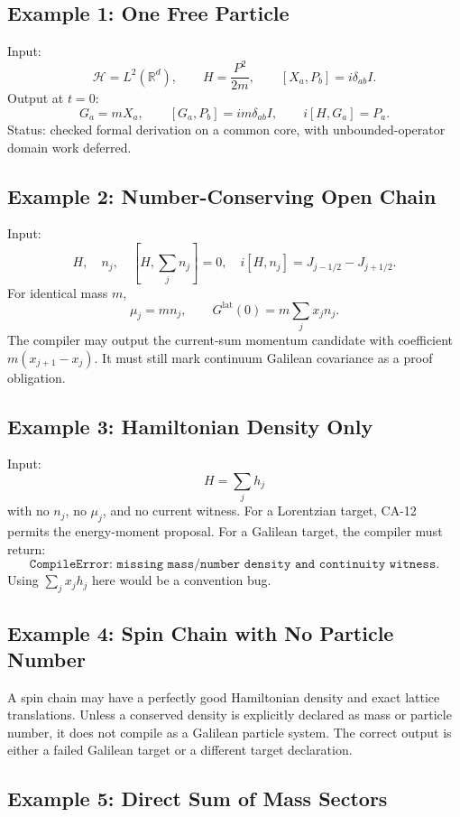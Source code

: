 \subsection{Example 1: One Free Particle}

Input:
\[
  \mathcal H=L^2(\mathbb R^d),\qquad
  H=\frac{P^2}{2m},\qquad
  [X_a,P_b]=i\delta_{ab}I.
\]
Output at \(t=0\):
\[
  G_a=mX_a,\qquad
  [G_a,P_b]=im\delta_{ab}I,\qquad
  i[H,G_a]=P_a.
\]
Status: checked formal derivation on a common core, with unbounded-operator
domain work deferred.

\subsection{Example 2: Number-Conserving Open Chain}

Input:
\[
  H,\quad n_j,\quad [H,\sum_j n_j]=0,\quad
  i[H,n_j]=J_{j-1/2}-J_{j+1/2}.
\]
For identical mass \(m\),
\[
  \mu_j=mn_j,\qquad
  G^{\mathrm{lat}}(0)=m\sum_j x_jn_j.
\]
The compiler may output the current-sum momentum candidate with coefficient
\(m(x_{j+1}-x_j)\).  It must still mark continuum Galilean covariance as a proof
obligation.

\subsection{Example 3: Hamiltonian Density Only}

Input:
\[
  H=\sum_j h_j
\]
with no \(n_j\), no \(\mu_j\), and no current witness.  For a Lorentzian target,
CA-12 permits the energy-moment proposal.  For a Galilean target, the compiler
must return:
\[
  \texttt{CompileError: missing mass/number density and continuity witness.}
\]
Using \(\sum_jx_jh_j\) here would be a convention bug.

\subsection{Example 4: Spin Chain with No Particle Number}

A spin chain may have a perfectly good Hamiltonian density and exact lattice
translations.  Unless a conserved density is explicitly declared as mass or
particle number, it does not compile as a Galilean particle system.  The correct
output is either a failed Galilean target or a different target declaration.

\subsection{Example 5: Direct Sum of Mass Sectors}


